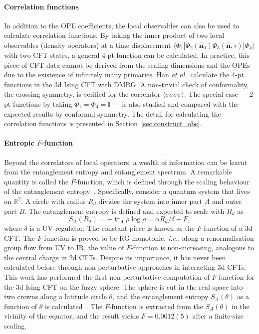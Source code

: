 \documentclass{timesjhep}
\begin{document}
\paragraph{Correlation functions~\cite{Han2023Jun}}

In addition to the OPE coefficients, the local observables can also be used to calculate correlation functions. By taking the inner product of two local observables (density operators) at a time displacement $\langle\Phi_1|\Phi_2(\hat{\mathbf{n}}_0)\Phi_3(\hat{\mathbf{n}},\tau)|\Phi_4\rangle$ with two CFT states, a general 4-pt function can be calculated. In practice, this piece of CFT data cannot be derived from the scaling dimensions and the OPEs due to the existence of infinitely many primaries. Han \textit{et al.}~calculate the 4-pt functions in the 3d Ising CFT with DMRG. A non-trivial check of conformality, the crossing symmetry, is verified for the correlator $\langle\sigma\sigma\sigma\sigma\rangle$. The special case --- 2-pt functions by taking $\Phi_1=\Phi_4=\mathbb{I}$ --- is also studied and compared with the expected results by conformal symmetry. The detail for calculating the correlation functions is presented in Section~\ref{sec:construct_obs}.

\paragraph{Entropic $F$-function~\cite{Hu2024}}

Beyond the correlators of local operators, a wealth of information can be learnt from the entanglement entropy and entanglement spectrum. A remarkable quantity is called the $F$-function, which is defined through the scaling behaviour of the entanglement entropy~\cite{Myers2010Fthm,Casini2011Fthm,Jafferis2011Fthm,Klebanov2011Fthm,Casini2012Fthm}. Specifically, consider a quantum system that lives on $\mathbb{R}^2$. A circle with radius $R_d$ divides the system into inner part $A$ and outer part $B$. The entanglement entropy is defined and expected to scale with $R_d$ as 
\begin{equation}
    S_A(R_d)=-\operatorname{tr}_A\rho\log\rho=\alpha R_d/\delta-F,
\end{equation}
where $\delta$ is a UV-regulator. The constant piece is known as the $F$-function of a 3d CFT. The $F$-function is proved to be RG-monotonic, \textit{i.e.}, along a renormalisation group flow from UV to IR, the value of $F$-function is non-increasing, analogous to the central charge in 2d CFTs. Despite its importance, it has never been calculated before through non-perturbative approaches in interacting 3d CFTs. This work has performed the first non-perturbative computation of $F$ function for the 3d Ising CFT on the fuzzy sphere. The sphere is cut in the real space into two crowns along a latitude circle $\theta$, and the entanglement entropy $S_A(\theta)$ as a function of $\theta$ is calculated~\cite{Sterdyniak2011RealEnt,Dubail2011RealEnt,Zaletel2012RealEnt,Rodriguez2011RealEnt}. The $F$-function is extracted from the $S_A(\theta)$ in the vicinity of the equator, and the result yields $F=0.0612(5)$ after a finite-size scaling.
\end{document}
